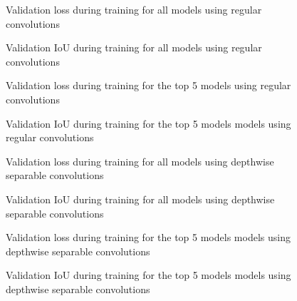\documentclass[runningheads]{llncs}
\begin{document}
\begin{figure}
    
    \caption{Validation loss during training for all models using regular convolutions}
    \label{regular_all_loss}
\end{figure}

\begin{figure}
    
    \caption{Validation IoU during training for all models using regular convolutions}
    \label{regular_all_iou}
\end{figure}

\begin{figure}
    
    \caption{Validation loss during training for the top 5 models using regular convolutions}
    \label{regular_top_loss}
\end{figure}

\begin{figure}
    
    \caption{Validation IoU during training for the top 5 models models using regular convolutions}
    \label{regular_top_iou}
\end{figure}

\begin{figure}
    
    \caption{Validation loss during training for all models using depthwise separable convolutions}
    \label{separable_all_loss}
\end{figure}

\begin{figure}
    
    \caption{Validation IoU during training for all models using depthwise separable convolutions}
    \label{separable_all_iou}
\end{figure}

\begin{figure}
    
    \caption{Validation loss during training for the top 5 models models using depthwise separable convolutions}
    \label{separable_top_loss}
\end{figure}

\begin{figure}
    
    \caption{Validation IoU during training for the top 5 models models using depthwise separable convolutions}
    \label{separable_top_iou}
\end{figure}
\end{document}
